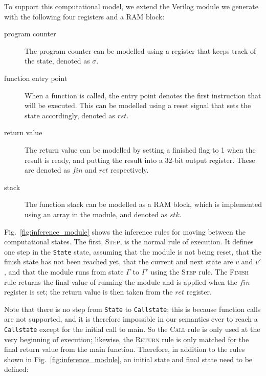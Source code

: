 To support this computational model, we extend the Verilog module we generate with the following four registers and a RAM block:

\begin{description}
  \item[program counter] The program counter can be modelled using a register that keeps track of the state, denoted as $\sigma$.
  \item[function entry point] When a function is called, the entry point denotes the first instruction that will be executed. This can be modelled using a reset signal that sets the state accordingly, denoted as $\mathit{rst}$.
  \item[return value] The return value can be modelled by setting a finished flag to 1 when the result is ready, and putting the result into a 32-bit output register. These are denoted as $\mathit{fin}$ and $\mathit{ret}$ respectively.
  \item[stack] The function stack can be modelled as a RAM block, which is implemented using an array in the module, and denoted as $\mathit{stk}$.
\end{description}

Fig.~\ref{fig:inference_module} shows the inference rules for moving between the computational states.  The first, \textsc{Step}, is the normal rule of execution.  It defines one step in the \texttt{State} state, assuming that the module is not being reset, that the finish state has not been reached yet, that the current and next state are $v$ and $v'$, and that the module runs from state $\Gamma$ to $\Gamma'$ using the \textsc{Step} rule.  The \textsc{Finish} rule returns the final value of running the module and is applied when the $\mathit{fin}$ register is set; the return value is then taken from the $\mathit{ret}$ register.

Note that there is no step from \texttt{State} to \texttt{Callstate}; this is because function calls are not supported, and it is therefore impossible in our semantics ever to reach a \texttt{Callstate} except for the initial call to main. So the \textsc{Call} rule is only used at the very beginning of execution; likewise, the \textsc{Return} rule is only matched for the final return value from the main function.
Therefore, in addition to the rules shown in Fig.~\ref{fig:inference_module}, an initial state and final state need to be defined:

